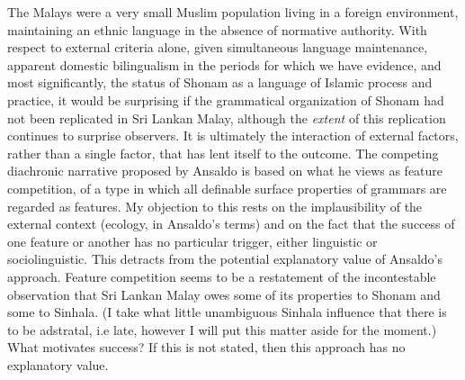 The Malays were a very small Muslim population living in a foreign environment, maintaining an ethnic language in the absence of normative authority. With respect to external criteria alone, given simultaneous language maintenance, apparent domestic bilingualism in the periods for which we have evidence, and most significantly, the status of Shonam as a language of Islamic process and practice, it would be surprising if the grammatical organization of Shonam had not been replicated in Sri Lankan Malay, although the \textit{extent} of this replication continues to surprise observers. It is ultimately the interaction of external factors, rather than a single factor, that has lent itself to the outcome. The competing diachronic narrative proposed by Ansaldo is based on what he views as feature competition, of a type in which all definable surface properties of grammars are regarded as features. My objection to this rests on the implausibility of the external context (ecology, in Ansaldo's terms) and on the fact that the success of one feature or another has no particular trigger, either linguistic or sociolinguistic. This detracts from the potential explanatory value of Ansaldo's approach. Feature competition seems to be a restatement of the incontestable observation that Sri Lankan Malay owes some of its properties to Shonam and some to Sinhala. (I take what little unambiguous Sinhala influence that there is to be adstratal, i.e late, however I will put this matter aside for the moment.) What motivates success? If this is not stated, then this approach has no explanatory value.  



